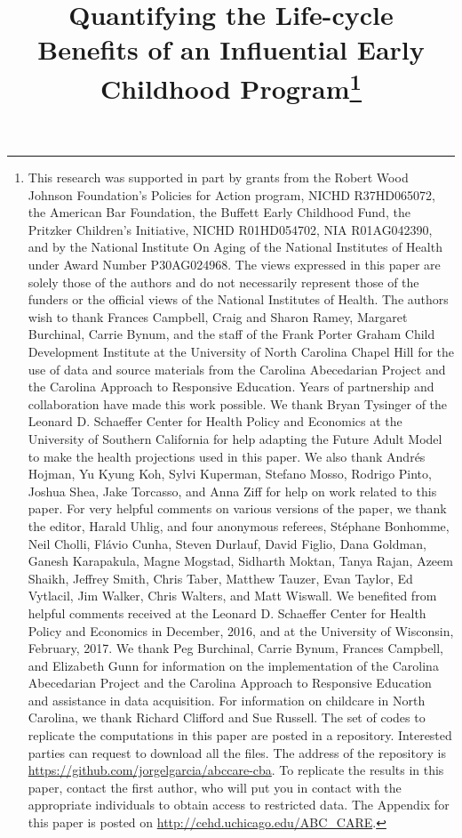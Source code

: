 \begin{titlepage}


\title{\Large \textbf{Quantifying the Life-cycle \\ Benefits of an Influential Early Childhood Program}\thanks{This research was supported in part by grants from the Robert Wood Johnson Foundation's Policies for Action program, NICHD R37HD065072, the American Bar Foundation, the Buffett Early Childhood Fund, the Pritzker Children's Initiative, NICHD R01HD054702, NIA R01AG042390, and by the National Institute On Aging of the National Institutes of Health under Award Number P30AG024968. The views expressed in this paper are solely those of the authors and do not necessarily represent those of the funders or the official views of the National Institutes of Health. The authors wish to thank Frances Campbell, Craig and Sharon Ramey, Margaret Burchinal, Carrie Bynum, and the staff of the Frank Porter Graham Child Development Institute at the University of North Carolina Chapel Hill for the use of data and source materials from the Carolina Abecedarian Project and the Carolina Approach to Responsive Education. Years of partnership and collaboration have made this work possible. We thank Bryan Tysinger of the Leonard D. Schaeffer Center for Health Policy and Economics at the University of Southern California for help adapting the Future Adult Model to make the health projections used in this paper. We also thank Andr\'{e}s Hojman, Yu Kyung Koh, Sylvi Kuperman, Stefano Mosso, Rodrigo Pinto, Joshua Shea, Jake Torcasso, and Anna Ziff for help on work related to this paper. For very helpful comments on various versions of the paper, we thank the editor, Harald Uhlig, and four anonymous referees, St\'{e}phane Bonhomme, Neil Cholli, Fl\'{a}vio Cunha, Steven Durlauf, David Figlio, Dana Goldman, Ganesh Karapakula, Magne Mogstad, Sidharth Moktan, Tanya Rajan, Azeem Shaikh, Jeffrey Smith, Chris Taber, Matthew Tauzer, Evan Taylor, Ed Vytlacil, Jim Walker, Chris Walters, and Matt Wiswall. We benefited from helpful comments received at the Leonard D. Schaeffer Center for Health Policy and Economics in December, 2016, and at the University of Wisconsin, February, 2017. We thank Peg Burchinal, Carrie Bynum, Frances Campbell, and Elizabeth Gunn for information on the implementation of the Carolina Abecedarian Project and the Carolina Approach to Responsive Education and assistance in data acquisition. For information on childcare in North Carolina, we thank Richard Clifford and Sue Russell. The set of codes to replicate the computations in this paper are posted in a repository. Interested parties can request to download all the files. The address of the repository is \url{https://github.com/jorgelgarcia/abccare-cba}. To replicate the results in this paper, contact the first author, who will put you in contact with the appropriate individuals to obtain access to restricted data. The Appendix for this paper is posted on \url{http://cehd.uchicago.edu/ABC_CARE}.}}


\end{titlepage}
